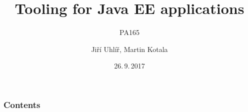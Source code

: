 \documentclass[pdf,compress]{beamer}
\title{Tooling for Java EE applications}
\subtitle{PA165}
\date{26.\,9.\,2017}
\author{Jiří Uhlíř, Martin Kotala}
\begin{document}
\frame{\titlepage}

\section[]{}
\begin{frame}
\frametitle{Contents}
\tableofcontents[hideallsubsections]
\end{frame}


%
\end{document}
